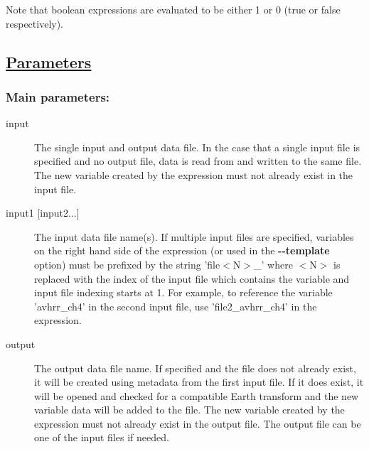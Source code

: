  Note that boolean expressions are evaluated to be either 1 or 0 (true or false respectively). 
\subsection*{\underline{Parameters}}
\subsubsection*{Main parameters:}
\begin{description}
\item[input]The single input and output data file. In the case that a single input file is specified and no output file, data is read from and written to the same file. The new variable created by the expression must not already exist in the input file.
\item[input1 [input2...{]}]The input data file name(s). If multiple input files are specified, variables on the right hand side of the expression (or used in the \textbf{-{-}template}
 option) must be prefixed by the string 'file$<$N$>$\_' where $<$N$>$ is replaced with the index of the input file which contains the variable and input file indexing starts at 1. For example, to reference the variable 'avhrr\_ch4' in the second input file, use 'file2\_avhrr\_ch4' in the expression.
\item[output]The output data file name. If specified and the file does not already exist, it will be created using metadata from the first input file. If it does exist, it will be opened and checked for a compatible Earth transform and the new variable data will be added to the file. The new variable created by the expression must not already exist in the output file. The output file can be one of the input files if needed.

\end{description}
